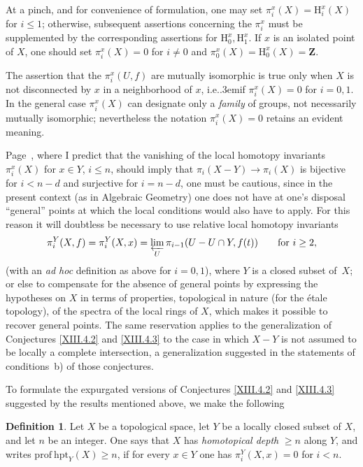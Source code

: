 \documentclass[11pt,a4paper,oneside]{book}
\providecommand{\sisi}[2]{#2}
\providecommand{\pageoriginale}{%
  \refstepcounter{pageoriginal}%
  \marginpar{\raggedright\footnotesize\bfseries\thepageoriginal}%
  \xspace}
\providecommand{\og}{``}
\providecommand{\fg}{''\xspace}
\providecommand{\ie}{i.e.\kern.3em}
\providecommand{\quoi}{}
\providecommand{\ZZ}{\mathbf Z}
\renewcommand{\H}{\mathrm H}
\theoremstyle{plain}
\theoremstyle{definition}
\newtheorem{supdefinition}[subsection]{Definition}
\theoremstyle{remark}
\renewcommand{\Ref}[1]{\textup{\ref{#1}}}
\begin{document}
\sisi{At}{At} a pinch, and for convenience of formulation, one may set $\pi_i^x(X)=\H_i^x(X)$ for $i\leq 1$; otherwise, subsequent assertions concerning the $\pi_i^x$ must be supplemented by the corresponding assertions for $\H_0^x,\H_1^x$. If $x$ is an isolated point of $X$, one should set $\pi_i^x(X)=0$ for $i\neq 0$ and $\pi_0^x(X)=\H_0^x(X)=\ZZ$.

The assertion\pageoriginale that the $\pi_i^x(U,f)$ are mutually isomorphic is true only when $X$ is not disconnected by $x$ in a neighborhood of $x$, \ie if $\pi_i^x(X)=0$ for $i=0,1$. In the general case $\pi_i^x(X)$ can designate only a \emph{family} of groups, not necessarily mutually isomorphic; nevertheless the notation $\pi_i^x(X)=0$ retains an evident meaning.

\label{p26y}\sisi{Page~15, line~-~11}{Page~\pageref{p15l}}, where I predict that the vanishing of the local homotopy invariants $\pi_i^x(X)$ for $x\in Y$, $i\leq n$, should imply that $\pi_i(X-Y)\to\pi_i(X)$ is bijective for $i<n-d$ and surjective for $i=n-d$, one must be cautious, since in the present context (as in Algebraic Geometry) one does not have at one's disposal \og general\fg points at which the local conditions would also have to apply. For this reason it will doubtless be necessary to use relative local homotopy invariants
$$
\pi_i^Y(X,f)=\pi_i^Y(X,x)=\varprojlim_U\pi_{i-1}(U-U\cap Y,f(t))\qquad\text{for }i\geq 2\quoi,
$$
(with an {\sisi{ad-hoc}{\textit{ad hoc}}} definition as above for $i=0,1$), where $Y$ is a closed subset of~$X$; or else to compensate for the absence of general points by expressing the hypotheses on $X$ in terms of properties, topological in nature (for the \'etale topology), of the spectra of the local rings of $X$, which makes it possible to recover general points. The same reservation applies to the generalization of Conjectures \Ref{XIII.4.2} and \Ref{XIII.4.3} to the case in which $X-Y$ is not assumed to be locally a complete intersection, a generalization suggested in the statements of conditions~b) of those conjectures.

To formulate the expurgated versions of Conjectures \Ref{XIII.4.2} and \Ref{XIII.4.3} suggested by the results mentioned above, we make the following

\begin{supdefinition} \label{XIII.6.1}
Let $X$ be a topological space, let $Y$ be a locally closed subset of $X$, and let $n$ be an integer. One says that $X$ has \emph{homotopical depth} $\geq n$ along $Y$, and writes $\mathrm{prof\:hpt}_Y(X)\geq n$, if for every $x\in Y$ one has $\pi_i^Y(X,x)=0$ for $i<n$.
\end{supdefinition}
\end{document}
